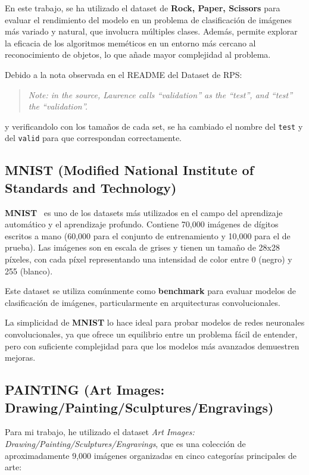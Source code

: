En este trabajo, se ha utilizado el dataset de \textbf{Rock, Paper, Scissors} para evaluar el rendimiento del modelo en
un problema de clasificación de imágenes más variado y natural, que involucra múltiples clases.
Además, permite explorar la eficacia de los algoritmos meméticos en un entorno más cercano al reconocimiento de
objetos, lo que añade mayor complejidad al problema.

Debido a la nota observada en el README del Dataset de RPS:
\begin{quote}
\textit{Note: in the source, Laurence calls ``validation'' as the ``test'', and ``test'' the ``validation''.}
\end{quote}
y verificandolo con los tamaños de cada set, se ha cambiado el nombre del \texttt{test} y del \texttt{valid} para que
correspondan correctamente.

\subsection{MNIST (Modified National Institute of Standards and Technology)}\label{subsec:mnist}
\textbf{MNIST}~\cite{MNIST Dataset} es uno de los datasets más utilizados en el campo del aprendizaje automático y el
aprendizaje profundo.
Contiene 70,000 imágenes de dígitos escritos a mano (60,000 para el conjunto de entrenamiento y 10,000 para el de
prueba).
Las imágenes son en escala de grises y tienen un tamaño de 28x28 píxeles, con cada píxel representando una intensidad
de color entre 0 (negro) y 255 (blanco).

Este dataset se utiliza comúnmente como \textbf{benchmark} para evaluar modelos de clasificación de imágenes,
particularmente en arquitecturas convolucionales.

La simplicidad de \textbf{MNIST} lo hace ideal para probar modelos de redes neuronales convolucionales, ya que ofrece un
equilibrio entre un problema fácil de entender, pero con suficiente complejidad para que los modelos más avanzados
demuestren mejoras.

\subsection{PAINTING (Art Images: Drawing/Painting/Sculptures/Engravings)}
\label{subsec:painting-(art-images:-drawing/painting/sculptures/engravings)}

Para mi trabajo, he utilizado el dataset \textit{Art Images: Drawing/Painting/Sculptures/Engravings}, que es una colección de aproximadamente 9,000 imágenes organizadas en cinco categorías principales de arte:


